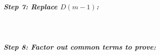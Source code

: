 \begin{questionNOGRADE}{\thequestion}
            \subparagraph{Step 7: Replace $D(m-1)$:}~\\

            \subparagraph{Step 8: Factor out common terms to prove:}~\\
            
        \end{questionNOGRADE}

        \newpage
        
